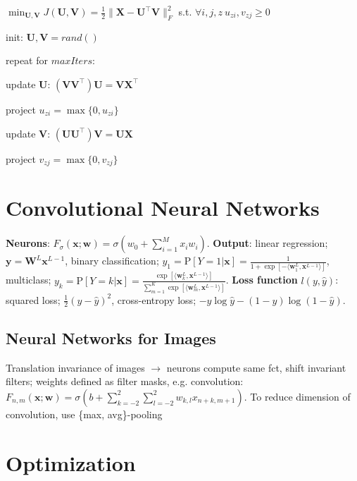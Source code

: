 \documentclass[a4paper, 11pt, landscape]{article}
\begin{document}
\begin{multicols*}{3}
    $\min_{\mathbf{U}, \mathbf{V}} J(\mathbf{U}, \mathbf{V}) = \frac{1}{2} \|\mathbf{X} - \mathbf{U}^\top\mathbf{V}\|_F^2$ s.t. $\forall i,j,z~u_{zi},v_{zj} \geq 0 $

    \begin{inparaenum}
    \item init: $\mathbf{U}, \mathbf{V} = rand()$
    \item repeat for $\mathit{maxIters}$:
    \item update $\mathbf{U}$: $(\mathbf{VV}^\top)\mathbf{U} = \mathbf{VX}^\top$
    \item project $u_{zi} = \max \{ 0, u_{zi} \}$
    \item update $\mathbf{V}$: $(\mathbf{UU}^\top)\mathbf{V} = \mathbf{UX}$
    \item project $v_{zj} = \max \{ 0, v_{zj} \}$
    \end{inparaenum}

    \section{Convolutional Neural Networks}
    \textbf{Neurons}: $F_\sigma(\mathbf{x};\mathbf{w}) = \sigma(w_0 + \sum_{i=1}^M{x_iw_i})$. \textbf{Output}: linear regression; $\mathbf{y} = \mathbf{W}^L\mathbf{x}^{L-1}$, binary classification; $y_1 = \text{P}[Y=1|\mathbf{x}] = \frac{1}{1 + \exp[-\langle \mathbf{w}_1^L,\mathbf{x}^{L-1}\rangle]}$, multiclass; $y_k = \text{P}[Y=k|\mathbf{x}]= \frac{\exp[\langle \mathbf{w}_k^L,\mathbf{x}^{L-1}\rangle]}{\sum_{m=1}^{K}{\exp[\langle \mathbf{w}_m^L, \mathbf{x}^{L-1}\rangle]}}$. \textbf{Loss function} $l(y, \hat{y})$: squared loss; $\frac{1}{2}(y - \hat{y})^2$, cross-entropy loss; $-y \log \hat{y} - (1-y)\log(1-\hat{y})$.

    \subsection{Neural Networks for Images}
    Translation invariance of images $\rightarrow$ neurons compute same fct, shift invariant filters; weights defined as filter masks, e.g. convolution: $F_{n,m}(\mathbf{x};\mathbf{w}) = \sigma(b + \sum_{k=-2}^2\sum_{l=-2}^{2}{w_{k,l}x_{n+k,m+1}})$. To reduce dimension of convolution, use \{max, avg\}-pooling 

    \section{Optimization}


\end{multicols*}
\end{document}
